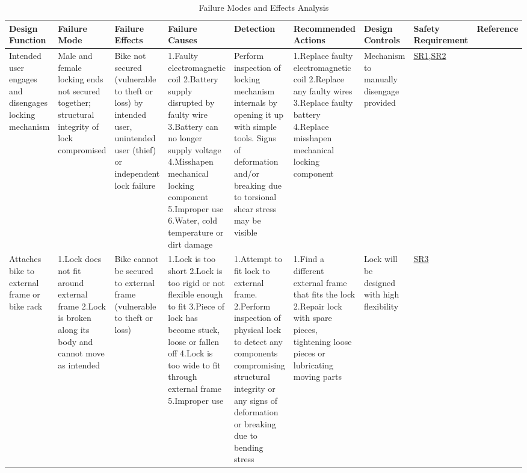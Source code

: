 \documentclass{article}
\begin{document}
\begin{table}[H]
\caption{Failure Modes and Effects Analysis}
\tiny
\begin{tabular}{| p{} | p{}  | p{} | p{} | p{} | p{} | p{} | p{} | p{} |}
\hline
\textbf{Design Function} & \textbf{Failure Mode} & \textbf{Failure Effects} & \textbf{Failure Causes} & \textbf{Detection} & \textbf{Recommended Actions} & \textbf{Design Controls} & \textbf{Safety Requirement} & \textbf{Reference} \\ \hline
Intended user engages and disengages locking mechanism & Male and female locking ends not secured together; structural integrity of lock compromised & Bike not secured (vulnerable to theft or loss) by intended user, unintended user (thief) or independent lock failure & 1.Faulty electromagnetic coil \newline 2.Battery supply disrupted by faulty wire \newline 3.Battery can no longer supply voltage \newline 4.Misshapen mechanical locking component \newline 5.Improper use \newline 6.Water, cold temperature or dirt damage & Perform inspection of locking mechanism internals by opening it up with simple tools. Signs of deformation and/or breaking due to torsional shear stress may be visible & 1.Replace faulty electromagnetic coil \newline 2.Replace any faulty wires \newline 3.Replace faulty battery \newline 4.Replace misshapen mechanical locking component & Mechanism to manually disengage provided & \hyperref[SR1]{SR1},\hyperref[SR2]{SR2} &  \\ \hline

Attaches bike to external frame or bike rack & 1.Lock does not fit around external frame  \newline 2.Lock is broken along its body and cannot move as intended & Bike cannot be secured to external frame (vulnerable to theft or loss) & 1.Lock is too short \newline 2.Lock is too rigid or not flexible enough to fit \newline 3.Piece of lock has become stuck, loose or fallen off \newline 4.Lock is too wide to fit through external frame \newline 5.Improper use & 1.Attempt to fit lock to external frame.  \newline 2.Perform inspection of physical lock to detect any components compromising structural integrity or any signs of deformation or breaking due to bending stress & 1.Find a different external frame that fits the lock \newline 2.Repair lock with spare pieces, tightening loose pieces or lubricating moving parts & Lock will be designed with high flexibility & \hyperref[SR3]{SR3}  &  \\ \hline


\end{tabular}
\end{table}
\end{document}
